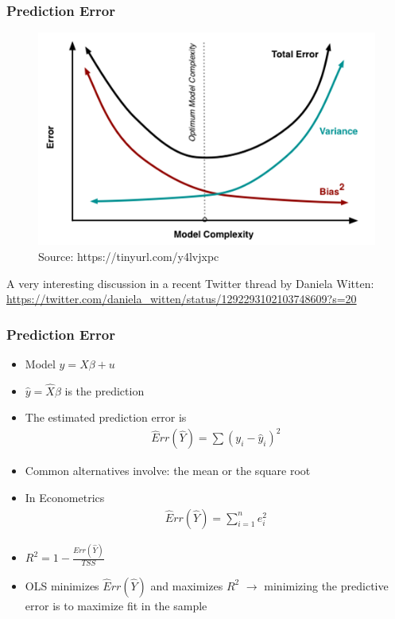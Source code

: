 \documentclass[
  shownotes,
  xcolor={svgnames},
  hyperref={colorlinks,citecolor=DarkBlue,linkcolor=DarkRed,urlcolor=DarkBlue}
  ]{beamer}
\begin{document}

\begin{frame}
\frametitle{Prediction Error}

\begin{figure}[H] \centering
  \centering
  \includegraphics[scale=0.50]{figures/medium_bias_variance_trade_off.png}
  \\
  \tiny
  Source: https://tinyurl.com/y4lvjxpc
\end{figure}


{\tiny A very interesting discussion in a recent Twitter thread by Daniela Witten: \url{https://twitter.com/daniela_witten/status/1292293102103748609?s=20}}
\end{frame}
\begin{frame}
\frametitle{Prediction Error}

\begin{itemize}
  \item Model $y=X\beta +u$
  \item $\hat y=\hat X\beta$ is the prediction 
  \item The estimated prediction error is 
  \begin{align}
    \hat Err (\hat Y ) = \sum (y_i-\hat y_i)^2
  \end{align}

  \item Common alternatives involve: the mean or the square root
  \item In Econometrics 
  \begin{align}
    \hat Err (\hat Y ) = \sum_{i=1}^n e_i^2
  \end{align}
  \item $R^2=1- \frac{Err (\hat Y )}{TSS}$ 
  
  \item OLS minimizes $\hat Err (\hat Y )$ and maximizes $R^2$ $\rightarrow$  minimizing the predictive error is to maximize fit in the sample

  
\end{itemize}
\end{frame}
\end{document}
